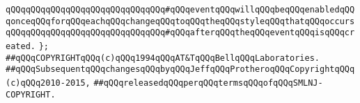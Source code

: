 \verb|qQQqqQQqqQQqqQQqqQQqqQQqqQQqqQQq#qQQqeventqQQqwillqQQqbeqQQqenabledqQQqonceqQQqforqQQqeachqQQqchangeqQQqtoqQQqtheqQQqstyleqQQqthatqQQqoccurs|\newline
\verb|qQQqqQQqqQQqqQQqqQQqqQQqqQQqqQQq#qQQqafterqQQqtheqQQqeventqQQqisqQQqcreated.|\newline
\newline
\verb|};|\newline
\newline
\verb|##qQQqCOPYRIGHTqQQq(c)qQQq1994qQQqAT&TqQQqBellqQQqLaboratories.|\newline
\verb|##qQQqSubsequentqQQqchangesqQQqbyqQQqJeffqQQqProtheroqQQqCopyrightqQQq(c)qQQq2010-2015,|\newline
\verb|##qQQqreleasedqQQqperqQQqtermsqQQqofqQQqSMLNJ-COPYRIGHT.|\newline

